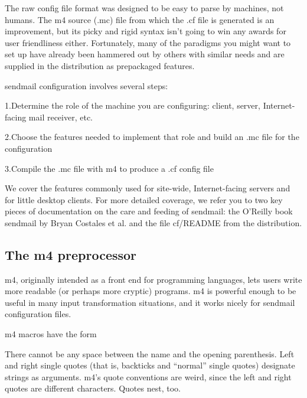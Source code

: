 The raw config file format was designed to be easy to parse by machines,
not humans. The {m4} source ({.mc}) file from which the{ .cf} file is
generated is an improvement, but its picky and rigid syntax isn't going
to win any awards for user friendliness either. Fortunately, many of the
paradigms you might want to set up have already been hammered out by
others with similar needs and are supplied in the distribution as
prepackaged features.

{sendmail} configuration involves several steps:

{1.}Determine the role of the machine you are configuring: client,
server, {Internet}-facing mail receiver, etc.

{2.}Choose the features needed to implement that role and build an {.mc}
file for the configuration

{3.}Compile the {.mc} file with {m4} to produce a {.cf} config file

We cover the features commonly used for site-wide, Internet-facing
servers and for little desktop clients. For more detailed coverage, we
refer you to two key pieces of documentation on the care and feeding of
{sendmail}: the O'Reilly book {sendmail} by Bryan Costales et al. and
the file {cf/README} from the distribution.

\protect\hypertarget{part0026_split_029.html}{}{}

\hypertarget{part0026_split_029.htmlux5cux23_idContainer1247}{}
\hypertarget{part0026_split_029.htmlux5cux23calibre_pb_28}{%
\subsection[The {m4}
preprocessor]{\texorpdfstring{Th\protect\hypertarget{part0026_split_029.htmlux5cux23_idTextAnchor1054}{}{}e
{m4}
preprocessor}{The m4 preprocessor}}\label{part0026_split_029.htmlux5cux23calibre_pb_28}}

\protect\hypertarget{part0026_split_029.htmlux5cux23_idIndexMarker2510}{}{}{m4},
originally intended as a front end for programming languages, lets users
write more readable (or perhaps more cryptic) programs. {m4} is powerful
enough to be useful in many input transformation situations, and it
works nicely for {sendmail} configuration files.

{m4} macros have the form


There cannot be any space between the name and the opening parenthesis.
Left and right single quotes (that is, backticks and ``normal'' single
quotes) designate strings as arguments. {m4}'s quote conventions are
weird, since the left and right quotes are different characters. Quotes
nest, too.

